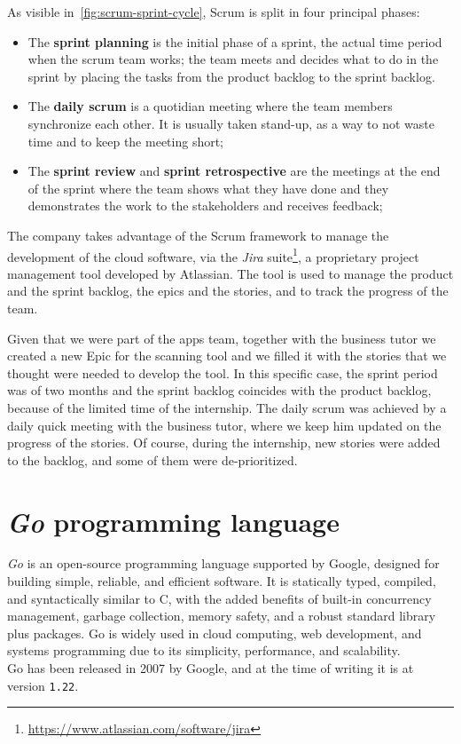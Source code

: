As visible in~\cref{fig:scrum-sprint-cycle}, Scrum is split in four principal phases:
\begin{itemize}
  \item The \textbf{sprint planning} is the initial phase of a sprint, the actual time period when the scrum team works; the team meets and decides what to do in the sprint by placing the tasks from the product backlog to the sprint backlog.
  \item The \textbf{daily scrum} is a quotidian meeting where the team members synchronize each other. It is usually taken stand-up, as a way to not waste time and to keep the meeting short;
  \item The \textbf{sprint review} and \textbf{sprint retrospective} are the meetings at the end of the sprint where the team shows what they have done and they demonstrates the work to the stakeholders and receives feedback;
\end{itemize}

The company takes advantage of the Scrum framework to manage the development of the cloud software, via the \textit{Jira} suite\footnote{\url{https://www.atlassian.com/software/jira}}, a proprietary project management tool developed by Atlassian. The tool is used to manage the product and the sprint backlog, the epics and the stories, and to track the progress of the team. 

Given that we were part of the apps team, together with the business tutor we created a new Epic for the scanning tool and we filled it with the stories that we thought were needed to develop the tool. In this specific case, the sprint period was of two months and the sprint backlog coincides with the product backlog, because of the limited time of the internship. The daily scrum was achieved by a daily quick meeting with the business tutor, where we keep him updated on the progress of the stories. Of course, during the internship, new stories were added to the backlog, and some of them were de-prioritized.

\section{\textit{Go} programming language}

\textit{Go} is an open-source programming language supported by Google, designed for building simple, reliable, and efficient software. It is statically typed, compiled, and syntactically similar to C, with the added benefits of built-in concurrency management, garbage collection, memory safety, and a robust standard library plus packages. Go is widely used in cloud computing, web development, and systems programming due to its simplicity, performance, and scalability.~\cite{go-lang-site}~\cite{go-lang-wikipedia}\\
Go has been released in 2007 by Google, and at the time of writing it is at version \texttt{1.22}.

